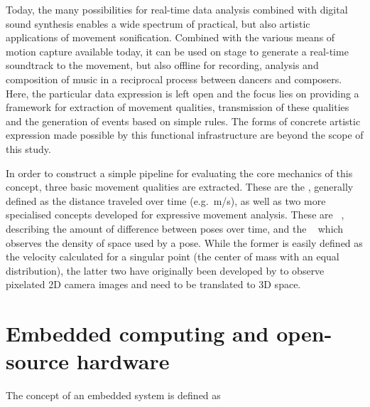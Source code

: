 Today, the many possibilities for real-time data analysis combined with digital sound synthesis enables a wide spectrum of practical, but also artistic applications of movement sonification.
Combined with the various means of motion capture available today, it can be used on stage to generate a real-time soundtrack to the movement, but also offline for recording, analysis and composition of music in a reciprocal process between dancers and composers.
Here, the particular data expression is left open and the focus lies on providing a framework for extraction of movement qualities, transmission of these qualities and the generation of events based on simple rules.
The forms of concrete artistic expression made possible by this functional infrastructure are beyond the scope of this study.

In order to construct a simple pipeline for evaluating the core mechanics of this concept, three basic movement qualities are extracted.
These are the , generally defined as the distance traveled over time (e.g.\ m/s), as well as two more specialised concepts developed for expressive movement analysis.
These are ~\parencite[96-97]{movementQualities}, describing the amount of difference between poses over time, and the ~\parencite[97]{movementQualities} which observes the density of space used by a pose.
While the former is easily defined as the velocity calculated for a singular point (the center of mass with an equal distribution), the latter two have originally been developed by to observe pixelated \ac{2D} camera images and need to be translated to \ac{3D} space.


\section{Embedded computing and open-source hardware}
\label{sec:embeddedcomputing}

The concept of an embedded system is defined as~

